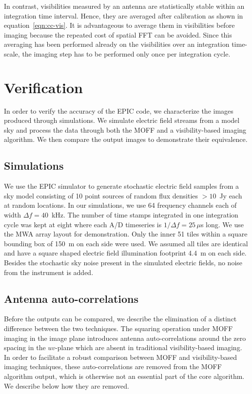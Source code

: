 \documentclass[a4paper,fleqn,usenatbib]{mnras}
\begin{document}
In contrast, visibilities measured by an antenna are statistically stable within
an integration time interval. Hence, they are averaged after calibration as shown
in equation~\ref{eqn:cc-vis}. It is advantageous to average them in visibilities
before imaging because the repeated cost of spatial FFT can be avoided. Since 
this averaging has been performed already on the visibilities over an integration 
time-scale, the imaging step has to be performed only once per integration cycle. 

\section{Verification}\label{sec:verify}

In order to verify the accuracy of the EPIC code, we characterize the images 
produced through simulations. We simulate electric field streams from a model 
sky and process the data through both the MOFF and a visibility-based imaging 
algorithm. We then compare the output images to demonstrate their equivalence.

\subsection{Simulations}\label{sec:sim}

We use the EPIC simulator to generate stochastic electric field samples from a sky model consisting of 10 point sources of random flux densities $>10$~Jy each at random locations. In our simulations, we use 64 frequency channels each of width $\Delta f = 40$~kHz. The number of time stamps integrated in one integration cycle was kept at eight where each A/D timeseries is $1/\Delta f=25\,\mu$s long. We use the MWA array layout \citep{bea12} for demonstration. Only the inner 51 tiles within a square bounding box of 150~m on each side were used. We assumed all tiles are identical and have a square shaped electric field illumination footprint 4.4~m on each side. Besides the stochastic sky noise present in the simulated electric fields, no noise from the instrument is added.

\subsection{Antenna auto-correlations}\label{sec:rm-autocorr}

Before the outputs can be compared, we describe the elimination of a distinct difference between the two techniques. The squaring operation under MOFF imaging in the image plane introduces antenna auto-correlations around the zero spacing in the $uv$-plane which are absent in traditional visibility-based imaging. In order to facilitate a robust comparison between MOFF and visibility-based imaging techniques, these auto-correlations are removed from the MOFF algorithm output, which is otherwise not an essential part of the core algorithm. We describe below how they are removed. 
\end{document}

